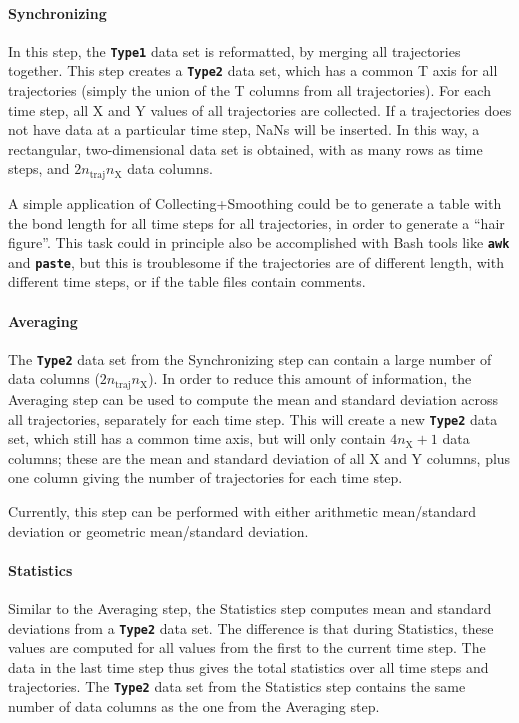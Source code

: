 \documentclass[a4paper,10pt,DIV=15,openany,twoside=false]{scrbook}
\newcommand{\ttt}[1]{\textbf{\texttt{#1}}}
\begin{document}
\paragraph{Synchronizing}

In this step, the \ttt{Type1} data set is reformatted, by merging all trajectories together.
This step creates a \ttt{Type2} data set, which has a common T axis for all trajectories (simply the union of the T columns from all trajectories).
For each time step, all X and Y values of all trajectories are collected.
If a trajectories does not have data at a particular time step, NaNs will be inserted.
In this way, a rectangular, two-dimensional data set is obtained, with as many rows as time steps, and $2n_\text{traj}n_\text{X}$ data columns.

A simple application of Collecting+Smoothing could be to generate a table with the bond length for all time steps for all trajectories, in order to generate a ``hair figure''.
This task could in principle also be accomplished with Bash tools like \ttt{awk} and \ttt{paste}, but this is troublesome if the trajectories are of different length, with different time steps, or if the table files contain comments.

\paragraph{Averaging}

The \ttt{Type2} data set from the Synchronizing step can contain a large number of data columns ($2n_\text{traj}n_\text{X}$).
In order to reduce this amount of information, the Averaging step can be used to compute the mean and standard deviation across all trajectories, separately for each time step.
This will create a new \ttt{Type2} data set, which still has a common time axis, but will only contain $4n_\text{X}+1$ data columns; these are the mean and standard deviation of all X and Y columns, plus one column giving the number of trajectories for each time step.

Currently, this step can be performed with either arithmetic mean/standard deviation or geometric mean/standard deviation.

\paragraph{Statistics}

Similar to the Averaging step, the Statistics step computes mean and standard deviations from a \ttt{Type2} data set.
The difference is that during Statistics, these values are computed for all values from the first to the current time step.
The data in the last time step thus gives the total statistics over all time steps and trajectories.
The \ttt{Type2} data set from the Statistics step  contains the same number of data columns as the one from the Averaging step.
\end{document}
